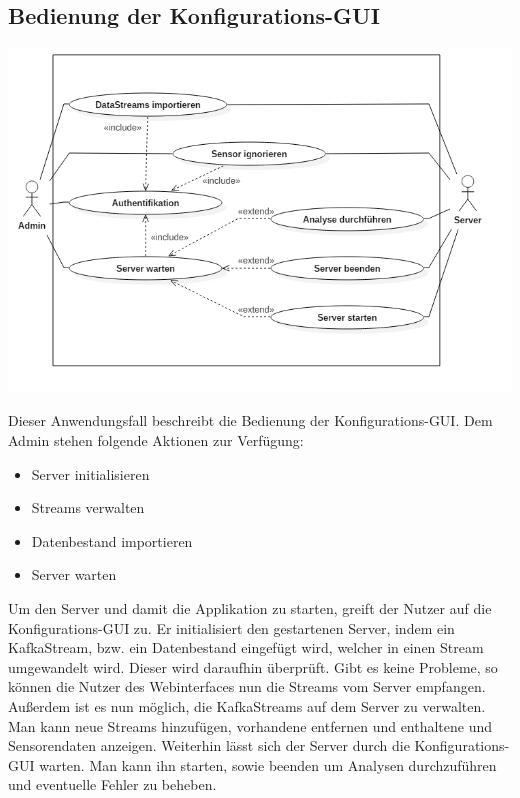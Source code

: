     \subsection{Bedienung der Konfigurations-GUI}
        \includegraphics[width=1\linewidth]{diagrams/UseCaseDiagram2.png}
        
        Dieser Anwendungsfall beschreibt die Bedienung der Konfigurations-GUI. Dem Admin stehen folgende Aktionen zur Verfügung:
        \begin{itemize}
            \item Server initialisieren
            \item {}Streams verwalten
            \item Datenbestand importieren
            \item Server warten
        \end{itemize}
        Um den Server und damit die Applikation zu starten, greift der Nutzer auf die Konfigurations-GUI zu. Er initialisiert den gestartenen Server, indem ein KafkaStream, bzw. ein Datenbestand eingefügt wird, welcher in einen Stream umgewandelt wird. Dieser wird daraufhin überprüft. Gibt es keine Probleme, so können die Nutzer des Webinterfaces nun die Streams vom Server empfangen. Außerdem ist es nun möglich, die KafkaStreams auf dem Server zu verwalten. Man kann neue Streams hinzufügen, vorhandene entfernen und enthaltene  und Sensorendaten anzeigen. Weiterhin lässt sich der Server durch die Konfigurations-GUI warten. Man kann ihn starten, sowie beenden um Analysen durchzuführen und eventuelle Fehler zu beheben.
        
